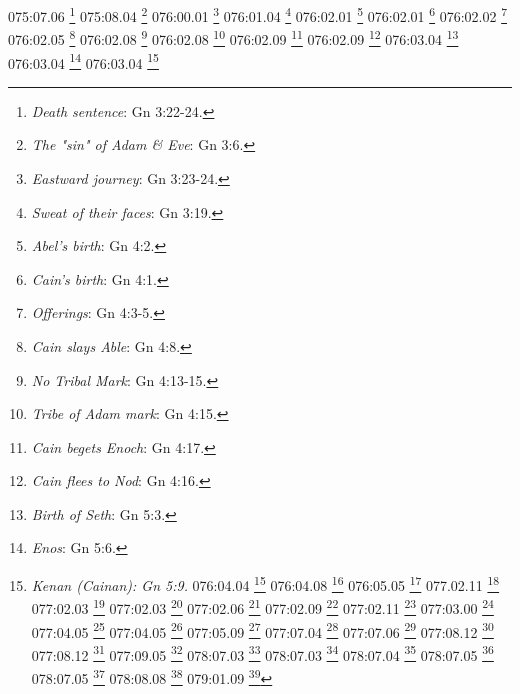 {{{{{{{{{{{{{{{{{{{{075:07.06 \footnote{\textit{Death sentence}: Gn 3:22-24.}
075:08.04 \footnote{\textit{The "sin" of Adam & Eve}: Gn 3:6.}
076:00.01 \footnote{\textit{Eastward journey}: Gn 3:23-24.}
076:01.04 \footnote{\textit{Sweat of their faces}: Gn 3:19.}
076:02.01 \footnote{\textit{Abel's birth}: Gn 4:2.}
076:02.01 \footnote{\textit{Cain's birth}: Gn 4:1.}
076:02.02 \footnote{\textit{Offerings}: Gn 4:3-5.}
076:02.05 \footnote{\textit{Cain slays Able}: Gn 4:8.}
076:02.08 \footnote{\textit{No Tribal Mark}: Gn 4:13-15.}
076:02.08 \footnote{\textit{Tribe of Adam mark}: Gn 4:15.}
076:02.09 \footnote{\textit{Cain begets Enoch}: Gn 4:17.}
076:02.09 \footnote{\textit{Cain flees to Nod}: Gn 4:16.}
076:03.04 \footnote{\textit{Birth of Seth}: Gn 5:3.}
076:03.04 \footnote{\textit{Enos}: Gn 5:6.}
076:03.04 \footnote{\textit{Kenan (Cainan): Gn 5:9.}
076:04.04 \footnote{\textit{Fruits of the trees}: Gn 1:29; Gn 2:16; Gn 3:2.}
076:04.08 \footnote{\textit{Racial upstepping}: Gn 6:2.}
076:05.05 \footnote{\textit{Adam's death}: Gn 5:5.}
077.02.11 \footnote{\textit{Three score and ten}: Sal 90:10.}
077:02.03 \footnote{\textit{God's sons, men's daughters}: Gn 6:4.}
077:02.03 \footnote{\textit{Land of giants}: Dt 2:20; Dt 3:13; Jos 12:4.}
077:02.06 \footnote{\textit{Nodite people}: Gn 4:16.}
077:02.09 \footnote{\textit{Nodite people}: Gn 4:16.}
077:02.11 \footnote{\textit{Length of life}: Gn 5:5,8,11,14; Gn 5:17,20,23,27; Gn 5:31; Gn 9:29; Gn 11:10-26.}
077:03.00 \footnote{\textit{Tower of Babel}: Gn 11:1-9.}
077:04.05 \footnote{\textit{Adamites marry Nodites}: Gn 6:2.}
077:04.05 \footnote{\textit{The land of Nod}: Gn 4:16.}
077:05.09 \footnote{\textit{Mighty men of old}: Gn 6:4.}
077:07.04 \footnote{\textit{Beelzebub}: Mt 10:25; Mt 12:24,27; Mc 3:22; Lc 11:15,18-19.}
077:07.06 \footnote{\textit{Brought sick people}: Mt 4:24.}
077:08.12 \footnote{\textit{Angel opens prison doors}: Hch 5:19.}
077:08.12 \footnote{\textit{Peter's deliverance}: Hch 12:7-10.}
077:09.05 \footnote{\textit{24 Counselors}: Ap 4:4,10; Ap 5:8,14; Ap 7:11; Ap 11:16; Ap 14:3; Ap 19:4.}
078:07.03 \footnote{\textit{Easy way out}: Gn 6:5-10.}
078:07.03 \footnote{\textit{Genealogy}: Gn 4:1-2,17-26; Gn 5:3-32; Gn 6:9-10; Gn 10:1-32; Gn 11:10-26.}
078:07.04 \footnote{\textit{No worldwide flood}: Gn 7:10-24.}
078:07.05 \footnote{\textit{Noah lived}: Gn 6:9-10.}
078:07.05 \footnote{\textit{The real flood}: Gn 7:10-24.}
078:08.08 \footnote{\textit{Sargon}: Is 20:1.}
079:01.09 \footnote{\textit{One God in heaven}: Gn 24:3,7; 1 Re 8:23; 2 Cr 20:6; 2 Cr 36:23; Esd 1:2; Esd 5:11-12; Neh 1:4-5; Sal 80:14; Sal 136:26; Ec 5:2; Dn 2:18-19,28; Dt 4:39; Jos 2:11.}
}}}}}}}}}}}}}}}}}}}}}

